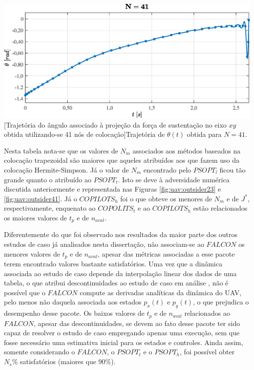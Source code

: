 \noindent	
\begin{minipage}{\textwidth}
	\vspace{\onelineskip}
	\centering
	\includegraphics[scale=0.68]{fig/resultados/uav/obs/outsider41}
	[Trajetória do ângulo associado à projeção da força de sustentação no eixo $xy$ obtida utilizando-se 41 nós de colocação]{Trajetória de $ \theta(t) $ obtida para $ N = 41 $.}
	\label{fig:uav:outsider41}
	\vspace{\onelineskip}
\end{minipage}
 




Nesta tabela nota-se que os valores de $ N_m $ associados aos métodos baseados na colocação trapezoidal são maiores que aqueles atribuídos aos que fazem uso da colocação Hermite-Simpson. Já o valor de $ N_m $ encontrado pelo $ PSOPT_l $ ficou tão grande quanto o atribuído ao $ PSOPT_t $. Isto se deve à adversidade numérica discutida anteriormente e representada nas Figuras \ref{fig:uav:outsider23} e \ref{fig:uav:outsider41}. Já o  $ COPILOTS_h $ foi o que obteve os menores de $ N_m $ e de $ J^* $, respectivamente, enquenato ao $ COPOLITS_t $ e ao $ COPILOTS_h $ estão relacionados os maiores valores de $ t_p $ e de $ n_{aval} $. 

Diferentemente do que foi observado nos resultados da maior parte dos outros estudos de caso já analisados nesta dissertação, não associam-se ao $ FALCON $ os menores valores de $ t_p $ e de $ n_{aval} $, apesar das métricas associadas a esse pacote terem encontrado valores bastante satisfatórios. Uma vez que a dinâmica associada ao estudo de caso depende da interpolação linear dos dados de uma tabela, o que atribui descontinuidades ao estudo de caso em análise \cite{betts_practical_2001}, não é possível que o $ FALCON $ compute as derivadas analíticas da dinâmica do UAV, pelo menos não daquela associada aos estados $ p_x(t) $ e $ p_y(t) $, o que prejudica o desempenho desse pacote. Os baixos valores de $ t_p $ e de $ n_{aval} $ relacionados ao $ FALCON $, apesar das descontinuidades, se devem ao fato desse pacote ter sido capaz de resolver o estudo de caso  empregando apenas uma execução, sem que fosse necessário uma estimativa inicial para os estados e controles. Ainda assim, somente considerando o $ FALCON $, o $ PSOPT_t $ e o $ PSOPT_h $, foi possível obter $ N_s\% $ satisfatórios (maiores que 90\%). 
 
